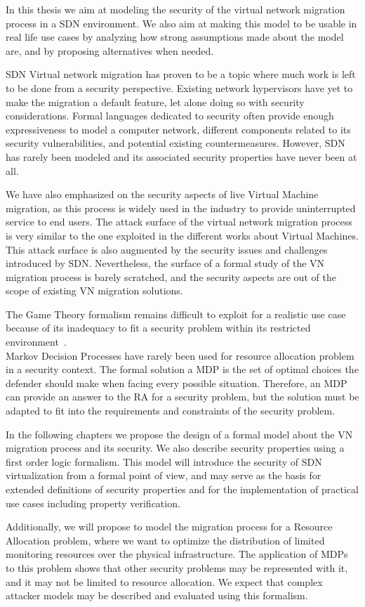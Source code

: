 In this thesis we aim at modeling the security of the virtual network migration process in a SDN environment.
We also aim at making this model to be usable in real life use cases by analyzing how strong assumptions made about the model are, and by proposing alternatives when needed.

SDN Virtual network migration has proven to be a topic where much work is left to be done from a security perspective.
Existing network hypervisors have yet to make the migration a default feature, let alone doing so with security considerations.
Formal languages dedicated to security often provide enough expressiveness to model a computer network, different components related to its security vulnerabilities, and potential existing countermeasures.
However, SDN has rarely been modeled and its associated security properties have never been at all.

We have also emphasized on the security aspects of live Virtual Machine migration, as this process is widely used in the industry to provide uninterrupted service to end users. 
The attack surface of the virtual network migration process is very similar to the one exploited in the different works about Virtual Machines. This attack surface is also augmented by the security issues and challenges introduced by SDN. Nevertheless, the surface of a formal study of the VN migration process is barely scratched, and the security aspects are out of the scope of existing VN migration solutions.

The Game Theory formalism remains difficult to exploit for a realistic use case because of its inadequacy to fit a security problem within its restricted environment~\cite{Kiennert2018}. \\
Markov Decision Processes have rarely been used for resource allocation problem in a security context. The formal solution a MDP is the set of optimal choices the defender should make when facing every possible situation. Therefore, an MDP can provide an answer to the RA for a security problem, but the solution must be adapted to fit into the requirements and constraints of the security problem.

In the following chapters we propose the design of a formal model about the VN migration process and its security. We also describe security properties using a first order logic formalism.
This model will introduce the security of SDN virtualization from a formal point of view, and may serve as the basis for extended definitions of security properties and for the implementation of practical use cases including property verification.

Additionally, we will propose to model the migration process for a Resource Allocation problem, where we want to optimize the distribution of limited monitoring resources over the physical infrastructure.
The application of MDPs to this problem shows that other security problems may be represented with it, and it may not be limited to resource allocation. We expect that complex attacker models may be described and evaluated using this formalism.